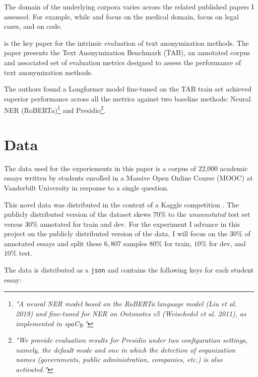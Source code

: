 \documentclass[11pt]{article}
\begin{document}
The domain of the underlying corpora varies across the related published papers I assessed. For example, while \citealt{hathurusinghe-etal-2021-privacy} and \citealt{vakili-etal-2022-downstream} focus on the medical domain, \citealt{pilan-etal-2022-text} focus on legal cases, and \citealt{vanderplas2022detecting} on code.

\citealt{pilan-etal-2022-text} is the key paper for the intrinsic evaluation of text anonymization methods. The paper presents the Text Anonymization Benchmark (TAB), an annotated corpus and associated set of evaluation metrics designed to assess the performance of text anonymization methods. 

The authors found a Longformer model fine-tuned on the TAB train set achieved superior performance across all the metrics against two baseline methods: Neural NER (RoBERTa)\footnote{\textit{"A neural NER model based on the RoBERTa language model (Liu et al. 2019) and fine-tuned for NER on Ontonotes v5 (Weischedel et al. 2011), as implemented in spaCy."}} and Presidio\footnote{\textit{"We provide evaluation results for Presidio under two configuration settings, namely, the default mode and one in which the detection of organization names (governments, public administration, companies, etc.) is also activated."}}.

\section{Data}

The data used for the experiements in this paper is a corpus of 22,000 academic essays written by students enrolled in a Massive Open Online Course (MOOC) at Vanderbilt University in response to a single question.

This novel data was distributed in the context of a Kaggle competition \cite{pii-detection-removal-from-educational-data}. The publicly distributed version of the dataset skews $70\%$ to the \textit{unannotated} test set versus $30\%$ annotated for train and dev. For the experiment I advance in this project on the publicly distributed version of the data, I will focus on the $30\%$ of annotated essays and split these $6,807$ samples $80\%$ for train, $10\%$ for dev, and $10\%$ test.

The data is distributed as a \texttt{json} \cite{pii-detection-removal-from-educational-data} and contains the following keys for each student essay:
\end{document}
